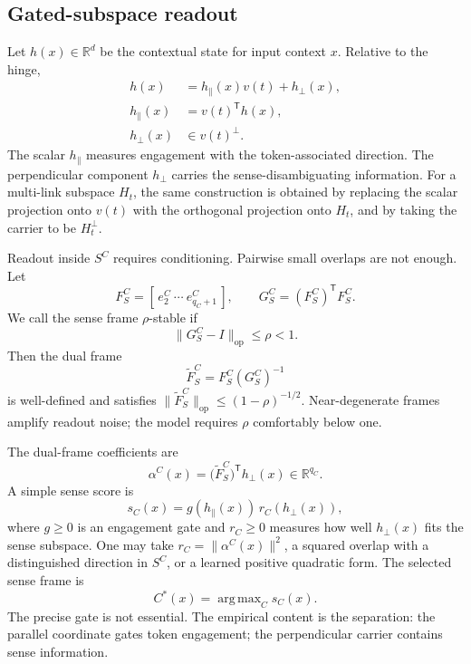 \documentclass[
  aps,
  reprint,
  superscriptaddress,
  floatfix,
  nofootinbib,
  longbibliography
]{revtex4-2}
\newcommand{\R}{\mathbb{R}}
\newcommand{\T}{^{\mathsf{T}}}
\newcommand{\opnorm}[1]{\lVert #1 \rVert_{\mathrm{op}}}
\newcommand{\norm}[1]{\lVert #1 \rVert}
\newcommand{\hpar}{h_{\parallel}}
\newcommand{\hperp}{h_{\perp}}
\DeclareMathOperator*{\argmax}{arg\,max}
\begin{document}
\subsection{Gated-subspace readout}
\label{sec:gated}

Let $h(x)\in\R^d$ be the contextual state for input context $x$.
Relative to the hinge,
%
\begin{align}
\label{eq:hinge-decomp}
h(x)&=\hpar(x)v(t)+\hperp(x),
\\
\hpar(x)&=v(t)\T h(x),  \nonumber
\\
\hperp(x)&\in v(t)^\perp .  \nonumber
\end{align}
%
The scalar $\hpar$ measures engagement with the token-associated
direction. The perpendicular component $\hperp$ carries the
sense-disambiguating information. For a multi-link subspace $H_t$, the
same construction is obtained by replacing the scalar projection onto
$v(t)$ with the orthogonal projection onto $H_t$, and by taking the
carrier to be $H_t^\perp$.

Readout inside $S^C$ requires conditioning. Pairwise small overlaps are
not enough. Let
%
\begin{equation}
F_S^C=[\,e_2^C\ \cdots\ e_{q_C+1}^C\,],
\qquad
G_S^C=(F_S^C)\T F_S^C .
\end{equation}
%
We call the sense frame $\rho$-stable if
%
\begin{equation}
\label{eq:rho-stable}
\opnorm{G_S^C-I}\le \rho<1 .
\end{equation}
%
Then the dual frame
%
\begin{equation}
\label{eq:dual-frame}
\widetilde F_S^C=F_S^C(G_S^C)^{-1}
\end{equation}
%
is well-defined and satisfies
$\opnorm{\widetilde F_S^C}\le(1-\rho)^{-1/2}$. Near-degenerate frames
amplify readout noise; the model requires $\rho$ comfortably below one.

The dual-frame coefficients are
%
\begin{equation}
\label{eq:alpha}
\alpha^C(x)=\bigl(\widetilde F_S^C\bigr)\T\hperp(x)
\in\R^{q_C}.
\end{equation}
%
A simple sense score is
%
\begin{equation}
\label{eq:sense-score}
s_C(x)=g(\hpar(x))\,r_C(\hperp(x)),
\end{equation}
%
where $g\ge0$ is an engagement gate and $r_C\ge0$ measures how well
$\hperp(x)$ fits the sense subspace. One may take
$r_C=\norm{\alpha^C(x)}^2$, a squared overlap with a distinguished
direction in $S^C$, or a learned positive quadratic form. The selected
sense frame is
%
\begin{equation}
\label{eq:selected-frame}
C^*(x)=\argmax_C s_C(x).
\end{equation}
%
The precise gate is not essential. The empirical content is the
separation: the parallel coordinate gates token engagement; the
perpendicular carrier contains sense information.
\end{document}
